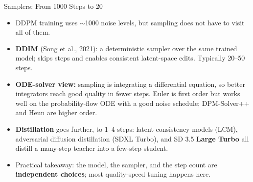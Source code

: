 \begin{frame}{Samplers: From 1000 Steps to 20}
  \begin{itemize}\itemsep0.28em
    \item DDPM training uses $\sim$1000 noise levels, but sampling does not have to visit all of them.
    \item \textbf{DDIM} (Song et al., 2021): a deterministic sampler over the same trained model; skips steps and enables consistent latent-space edits. Typically 20--50 steps.
    \item \textbf{ODE-solver view:} sampling is integrating a differential equation, so better integrators reach good quality in fewer steps. Euler is first order but works well on the probability-flow ODE with a good noise schedule; DPM-Solver++ and Heun are higher order.
    \item \textbf{Distillation} goes further, to 1--4 steps: latent consistency models (LCM), adversarial diffusion distillation (SDXL Turbo), and SD 3.5 \textbf{Large Turbo} all distill a many-step teacher into a few-step student.
    \item Practical takeaway: the model, the sampler, and the step count are \textbf{independent choices}; most quality-speed tuning happens here.
  \end{itemize}
\end{frame}
